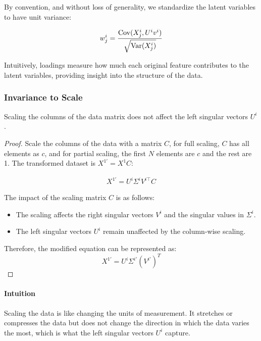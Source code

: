 By convention, and without loss of generality, we standardize the latent variables to have unit variance:

\begin{align}
    w^{i}_j = \frac{\mathrm{Cov}(X^{i}_j, U^{i}v^{i})}{\sqrt{\mathrm{Var}(X^{i}_j)}} \label{eq:standardized_loading}
\end{align}

Intuitively, \gls{loadings} measure how much each original feature contributes to the latent variables, providing insight into the structure of the data.

\subsubsection{Invariance to Scale}\label{subsubsec:invariance-to-scale}

\begin{lemma}
Scaling the columns of the data matrix does not affect the left singular vectors $U^{i}$.
\end{lemma}

\begin{proof}
Scale the columns of the data with a matrix $C$, for full scaling, \( C \) has all elements as \( c \), and for partial scaling, the first \( N \) elements are \( c \) and the rest are 1. The transformed dataset is \( X^{1'} = X^{1}C \):

\begin{align}
    X^{1'} = U^{i}\Sigma^{i}V^{i\top}C \label{eq:scaled_data}
\end{align}

The impact of the scaling matrix $C$ is as follows:
\begin{itemize}
\item The scaling affects the right singular vectors $V^i$ and the singular values in $\Sigma^i$.
\item The left singular vectors $U^i$ remain unaffected by the column-wise scaling.
\end{itemize}

Therefore, the modified equation can be represented as:
\begin{equation}
X^{1'} = U^i \Sigma^{i'} (V^{i'})^T \label{eq:modified_svd}
\end{equation}
\end{proof}

\paragraph{Intuition}
Scaling the data is like changing the units of measurement. 
It stretches or compresses the data but does not change the direction in which the data varies the most, which is what the left singular vectors $U^i$ capture.

